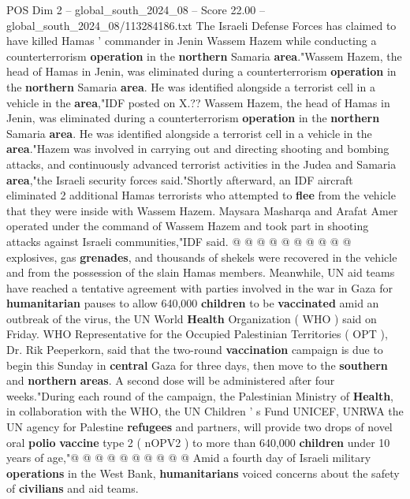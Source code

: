 \begin{textsample}{POS Dim 2 – global\_south\_2024\_08 – Score 22.00 – global\_south\_2024\_08/113284186.txt}  \label{ex:f2_pos_335}
The Israeli Defense Forces has claimed to have killed Hamas ' commander in Jenin Wassem Hazem while conducting a counterterrorism \textbf{operation} in the \textbf{northern} Samaria \textbf{area}."Wassem Hazem, the head of Hamas in Jenin, was eliminated during a counterterrorism \textbf{operation} in the \textbf{northern} Samaria \textbf{area}.
He was identified alongside a terrorist cell in a vehicle in the \textbf{area},"IDF posted on X.??
Wassem Hazem, the head of Hamas in Jenin, was eliminated during a counterterrorism \textbf{operation} in the \textbf{northern} Samaria \textbf{area}.
He was identified alongside a terrorist cell in a vehicle in the \textbf{area}."Hazem was involved in carrying out and directing shooting and bombing attacks, and continuously advanced terrorist activities in the Judea and Samaria \textbf{area},"the Israeli security forces said."Shortly afterward, an IDF aircraft eliminated 2 additional Hamas terrorists who attempted to \textbf{flee} from the vehicle that they were inside with Wassem Hazem.
Maysara Masharqa and Arafat Amer operated under the command of Wassem Hazem and took part in shooting attacks against Israeli communities,"IDF said. @ @ @ @ @ @ @ @ @ @ explosives, gas \textbf{grenades}, and thousands of shekels were recovered in the vehicle and from the possession of the slain Hamas members.
Meanwhile, UN aid teams have reached a tentative agreement with parties involved in the war in Gaza for \textbf{humanitarian} pauses to allow 640,000 \textbf{children} to be \textbf{vaccinated} amid an outbreak of the virus, the UN World \textbf{Health} Organization ( WHO ) said on Friday.
WHO Representative for the Occupied Palestinian Territories ( OPT ), Dr.
Rik Peeperkorn, said that the two-round \textbf{vaccination} campaign is due to begin this Sunday in \textbf{central} Gaza for three days, then move to the \textbf{southern} and \textbf{northern} \textbf{areas}.
A second dose will be administered after four weeks."During each round of the campaign, the Palestinian Ministry of \textbf{Health}, in collaboration with the WHO, the UN Children ' s Fund UNICEF, UNRWA the UN agency for Palestine \textbf{refugees} and partners, will provide two drops of novel oral \textbf{polio} \textbf{vaccine} type 2 ( nOPV2 ) to more than 640,000 \textbf{children} under 10 years of age,"@ @ @ @ @ @ @ @ @ @ Amid a fourth day of Israeli military \textbf{operations} in the West Bank, \textbf{humanitarians} voiced concerns about the safety of \textbf{civilians} and aid teams.

\end{textsample}

